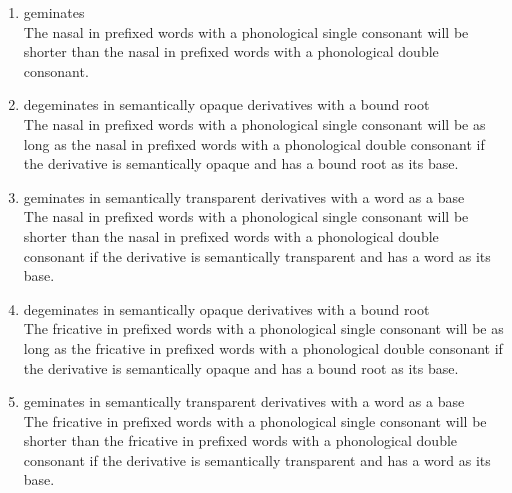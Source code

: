 	
\begin{enumerate}

	\item {} geminates \\
	The nasal in prefixed words with a phonological single consonant will be shorter than the nasal in prefixed words with a phonological double consonant. 
	
	\item{} degeminates in semantically opaque derivatives with a bound root\\
	The nasal in prefixed words with a phonological single consonant will be as long as the nasal in prefixed words with a phonological double consonant if  the derivative is semantically opaque and has a bound root as its base.
	

	
	\item {} geminates in semantically transparent derivatives with a word as a base \\
	The nasal in prefixed words with a phonological single consonant will be shorter than the nasal in prefixed words with a phonological double consonant if  the derivative is semantically transparent and has a word as its base.
	
	
	\item {} degeminates in semantically opaque derivatives with a bound root\\
	The fricative in prefixed words with a phonological single consonant will be as long as the fricative in prefixed words with a phonological double consonant if  the derivative is semantically opaque and has a bound root as its base.
	
	\item {} geminates in semantically transparent derivatives with a word as a base \\
	The fricative in prefixed words with a phonological single consonant will be shorter than the fricative in prefixed words with a phonological double consonant if  the derivative is semantically transparent and has a word as its base.\\
	

\end{enumerate}

